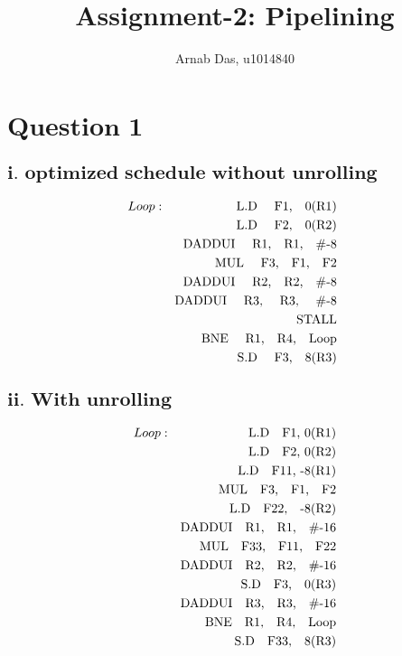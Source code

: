 \documentclass{tufte-handout}
\title{Assignment-2: Pipelining}
\author[]{Arnab Das, u1014840}
\begin{document}
  
  \maketitle%
  

 \setcounter{secnumdepth}{1}

\newpage

  \section{$\textbf{Question 1}$}
  	\subsection{$\textbf{i.\ optimized schedule without unrolling}$}
		\begin{eqnarray*}
			Loop : & & \mbox{L.D \quad F1,\quad0(R1) }\\
			       & & \mbox{L.D \quad F2,\quad 0(R2) }\\
				   & & \mbox{DADDUI \quad R1,\quad R1,\quad \#-8  }\\
				   & & \mbox{MUL \quad F3,\quad F1,\quad F2  }\\
				   & & \mbox{DADDUI \quad R2,\quad R2,\quad \#-8  }\\
				   & & \mbox{DADDUI \quad R3, \quad R3, \quad \#-8  }\\
				   & & \mbox{STALL  }\\
				   & & \mbox{BNE \quad R1,\quad R4,\quad Loop } \\
				   & & \mbox{S.D \quad F3,\quad 8(R3) } \\
		\end{eqnarray*}

	\subsection{$\textbf{ii.\ With unrolling}$}
		\begin{eqnarray*}
			Loop : & & \mbox{L.D\quad F1, 0(R1)} \\
			       & & \mbox{L.D\quad F2, 0(R2)} \\
			       & & \mbox{L.D\quad F11, -8(R1)} \\
			       & & \mbox{MUL\quad F3,\quad F1,\quad F2} \\
			       & & \mbox{L.D\quad F22,\quad -8(R2)} \\
			       & & \mbox{DADDUI\quad R1,\quad R1,\quad \#-16} \\
			       & & \mbox{MUL\quad F33,\quad F11,\quad F22} \\
			       & & \mbox{DADDUI\quad R2,\quad R2,\quad \#-16} \\
			       & & \mbox{S.D\quad F3,\quad 0(R3)} \\
			       & & \mbox{DADDUI\quad R3,\quad R3,\quad \#-16} \\
			       & & \mbox{BNE\quad R1,\quad R4,\quad Loop} \\
			       & & \mbox{S.D\quad F33,\quad 8(R3)} \\
		\end{eqnarray*}
\end{document}
